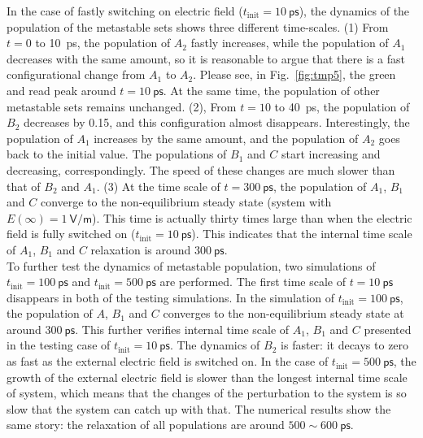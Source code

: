 \documentclass[aip,jcp,a4paper,preprint,onecolumn]{revtex4-1}
\begin{document}
In the case of fastly switching on electric field
($t_{\textrm{init}}=10~\textsf{ps}$), the dynamics of the population
of the metastable sets shows three different time-scales. (1) From
$t=0$ to 10~\textsf{ps}, the population of $A_2$ fastly increases,
while the population of $A_1$ decreases with the same amount, so it is
reasonable to argue that there is a fast configurational change from
$A_1$ to $A_2$. Please see, in Fig.~\ref{fig:tmp5}, the green and read
peak around $t = 10~\textsf{ps}$. At the same time, the population of
other metastable sets remains unchanged.  (2), From $t=10$ to
40~\textsf{ps}, the population of $B_2$ decreases by 0.15, and this
configuration almost disappears. Interestingly, the population of $A_1$
increases by the same amount, and the population of $A_2$ goes back to
the initial value. The populations of $B_1$ and $C$ start increasing
and decreasing, correspondingly. The speed of these changes are much
slower than that of $B_2$ and $A_1$.  (3) At the time scale of $t =
300~\textsf{ps}$, the population of $A_1$, $B_1$ and $C$ converge to
the non-equilibrium steady state (system with $E(\infty) = 1~\textsf{V/m}$).
This time is actually thirty times large than when the electric field
is fully switched on ($t_{\textrm{init}} = 10~\textsf{ps}$). This 
indicates that the internal time scale of $A_1$, $B_1$ and $C$
relaxation is around $300~\textsf{ps}$.\\

To further test the dynamics of metastable population, two simulations
of $t_{\textrm{init}} = 100~\textsf{ps}$ and $t_{\textrm{init}} =
500~\textsf{ps}$ are performed. The first time scale of $t =
10~\textsf{ps}$ disappears in both of the testing simulations. In the
simulation of $t_{\textrm{init}} = 100~\textsf{ps}$, the population of
$A$, $B_1$ and $C$ converges to the non-equilibrium steady state at
around $300~\textsf{ps}$. This further verifies internal time scale of
$A_1$, $B_1$ and $C$ presented in the testing case of
$t_{\textrm{init}} = 10~\textsf{ps}$.  The dynamics of $B_2$ is
faster: it decays to zero as fast as the external electric field is
switched on. In the case of $t_{\textrm{init}} = 500~\textsf{ps}$, the
growth of the external electric field is slower than the longest
internal time scale of system, which means that the changes of the
perturbation to the system is so slow that the system can catch up
with that. The numerical results show the same story: the relaxation
of all populations are around $500 \sim 600~\textsf{ps}$.
\\
\end{document}
